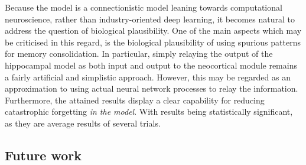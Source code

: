Because the model is a connectionistic model leaning towards computational neuroscience, rather than industry-oriented deep learning, it becomes natural to address the question of biological plausibility. One of the main aspects which may be criticised in this regard, is the biological plausibility of using spurious patterns for memory consolidation. In particular, simply relaying the output of the hippocampal model as both input and output to the neocortical module remains a fairly artificial and simplistic approach. However, this may be regarded as an approximation to using actual neural network processes to relay the information. Furthermore, the attained results display a clear capability for reducing catastrophic forgetting \textit{in the model}. With results being statistically significant, as they are average results of several trials.








\subsection*{Future work}


